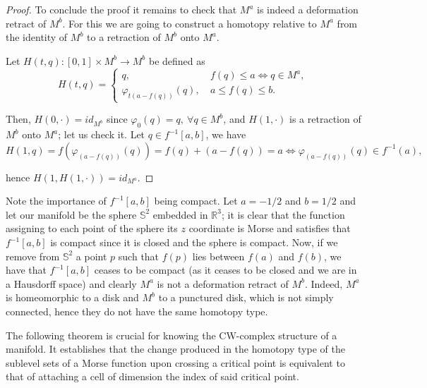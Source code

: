 \begin{proof}
     To conclude the proof it remains to check that $M^a$ is indeed a deformation retract of $M^b$. For this we are going to construct a homotopy relative to $M^a$ from the identity of $M^b$ to a retraction of $M^b$ onto $M^a$.

    Let $H(t,q):[0,1]\times M^b\to M^b$ be defined as
    \begin{equation*}
        H(t,q)=
        \begin{cases}
            q,&~f(q)\le a\iff q\in M^a,\\
            \varphi_{t(a-f(q))}(q),&~a\le f(q)\le b.
        \end{cases}
    \end{equation*}

    Then, $H(0,\cdot) = id_{M^b}$ since $\varphi_0(q)=q,~\forall q\in M^b$, and $H(1,\cdot)$ is a retraction of $M^b$ onto $M^a$; let us check it. Let $q\in f^{-1}[a,b]$, we have
    \begin{equation*}
        H(1,q)=f(\varphi_{(a-f(q))}(q))= f(q)+(a-f(q))= a \iff \varphi_{(a-f(q))}(q)\in f^{-1}(a),
    \end{equation*}

    hence $H(1,H(1,\cdot))= id_{M^a}$.

\end{proof}
\begin{remark}
    Note the importance of $f^{-1}[a,b]$ being compact. Let $a=-1/2$ and $b=1/2$ and let our manifold be the sphere $\mathbb{S}^2$ embedded in $\mathbb{R}^3$; it is clear that the function assigning to each point of the sphere its $z$ coordinate is Morse and satisfies that $f^{-1}[a,b]$ is compact since it is closed and the sphere is compact. Now, if we remove from $\mathbb{S}^2$ a point $p$ such that $f(p)$ lies between $f(a)$ and $f(b)$, we have that $f^{-1}[a,b]$ ceases to be compact (as it ceases to be closed and we are in a Hausdorff space) and clearly $M^a$ is not a deformation retract of $M^b$. Indeed, $M^a$ is homeomorphic to a disk and $M^b$ to a punctured disk, which is not simply connected, hence they do not have the same homotopy type. %
\end{remark}
\bigskip

The following theorem is crucial for knowing the CW-complex structure of a manifold. It establishes that the change produced in the homotopy type of the sublevel sets of a Morse function upon crossing a critical point is equivalent to that of attaching a cell of dimension the index of said critical point.

